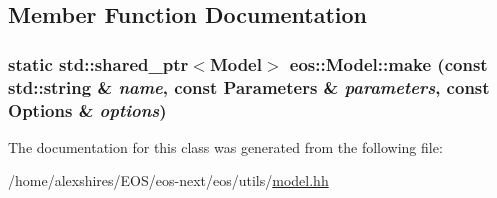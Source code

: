 \subsection{Member Function Documentation}
\hypertarget{classeos_1_1Model_aaaf8ba614a0212952f6f9485034c3436}{
\subsubsection[{make}]{\setlength{\rightskip}{0pt plus 5cm}static std::shared\_\-ptr$<${\bf Model}$>$ eos::Model::make (const std::string \& {\em name}, \/  const {\bf Parameters} \& {\em parameters}, \/  const {\bf Options} \& {\em options})}}
\label{classeos_1_1Model_aaaf8ba614a0212952f6f9485034c3436}


The documentation for this class was generated from the following file:\begin{DoxyCompactItemize}
\item 
/home/alexshires/EOS/eos-\/next/eos/utils/\hyperlink{model_8hh}{model.hh}\end{DoxyCompactItemize}
